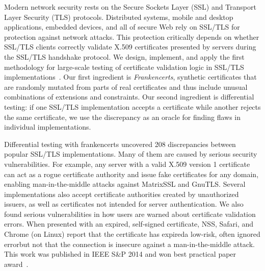 \documentclass[a4paper, 11pt]{article}
\begin{document}
\begin{small}
Modern network security rests on the Secure Sockets Layer (SSL) and
Transport Layer Security (TLS) protocols.  Distributed systems, mobile
and desktop applications, embedded devices, and all of secure Web rely
on SSL/TLS for protection against network attacks.  This protection
critically depends on whether SSL/TLS clients correctly validate X.509
certificates presented by servers during the SSL/TLS handshake protocol.
We design, implement, and apply the first methodology for large-scale
testing of certificate validation logic in SSL/TLS implementations~\cite{brubaker2014using}.
Our first ingredient is {\em Frankencerts}, synthetic certificates that are
randomly mutated from parts of real certificates and thus include unusual
combinations of extensions and constraints.  Our second ingredient is
differential testing: if one SSL/TLS implementation accepts a certificate
while another rejects the same certificate, we use the discrepancy as
an oracle for finding flaws in individual implementations.


Differential testing with frankencerts uncovered 208 discrepancies between
popular SSL/TLS implementations. Many of them are caused by serious security
vulnerabilities.  For example, any server with a valid X.509 version
1 certificate can act as a rogue certificate authority and issue fake
certificates for any domain, enabling man-in-the-middle attacks against
MatrixSSL and GnuTLS.  Several implementations also accept certificate
authorities created by unauthorized issuers, as well as certificates
not intended for server authentication. We also found serious vulnerabilities in how users are warned about
certificate validation errors.  When presented with an expired,
self-signed certificate, NSS, Safari, and Chrome (on Linux) report
that the certificate has expired\textemdash a low-risk, often ignored
error\textemdash but not that the connection is insecure against a
man-in-the-middle attack. This work was published in IEEE S\&P 2014 and won best practical paper award~\cite{brubaker2014using}.



\end{small}
\end{document}
